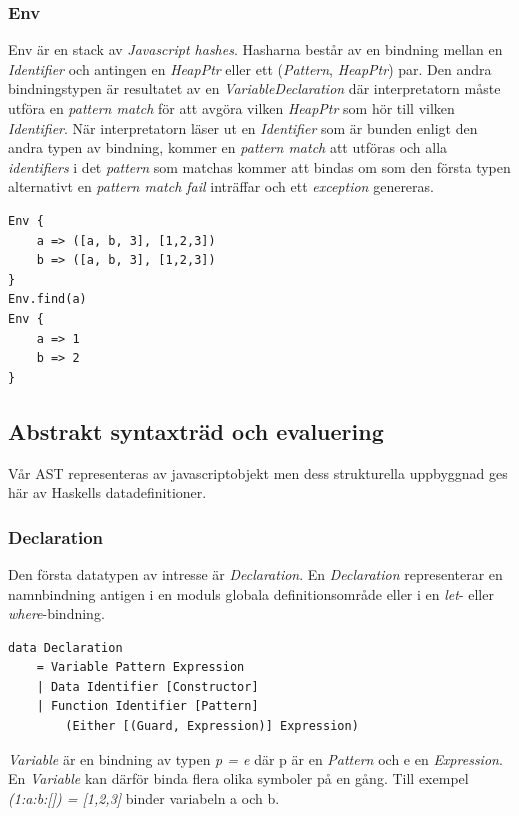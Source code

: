 \subsubsection{Env}
Env är en stack av \emph{Javascript hashes}. Hasharna består av en bindning mellan en \emph{Identifier} och antingen en \emph{HeapPtr} eller ett (\emph{Pattern}, \emph{HeapPtr}) par.  Den andra bindningstypen är resultatet av en \emph{VariableDeclaration} där interpretatorn måste utföra en \emph{pattern match} för att avgöra vilken \emph{HeapPtr} som hör till vilken \emph{Identifier}. När interpretatorn läser ut en \emph{Identifier} som är bunden enligt den andra typen av bindning, kommer en \emph{pattern match} att utföras och alla \emph{identifiers} i det \emph{pattern} som matchas kommer att bindas om som den första typen alternativt en \emph{pattern match fail} inträffar och ett \emph{exception} genereras.

\begin{lstlisting}
Env {
    a => ([a, b, 3], [1,2,3])
    b => ([a, b, 3], [1,2,3])
}
Env.find(a)
Env {
    a => 1
    b => 2
}
\end{lstlisting}

\subsection{Abstrakt syntaxträd och evaluering} 
Vår AST representeras av javascriptobjekt men dess strukturella uppbyggnad ges här av Haskells datadefinitioner.

\subsubsection{Declaration}
Den första datatypen av intresse är \emph{Declaration}. En \emph{Declaration} representerar en namnbindning antigen i en moduls globala definitionsområde eller i en \emph{let}- eller \emph{where}-bindning.

\begin{lstlisting}
data Declaration 
    = Variable Pattern Expression
    | Data Identifier [Constructor]
    | Function Identifier [Pattern] 
        (Either [(Guard, Expression)] Expression)
\end{lstlisting}

\emph{Variable} är en bindning av typen \emph{p = e} där p är en \emph{Pattern} och e en \emph{Expression}. En \emph{Variable} kan därför binda flera olika symboler på en gång. Till exempel \emph{(1:a:b:[]) = [1,2,3]} binder variabeln a och b.

